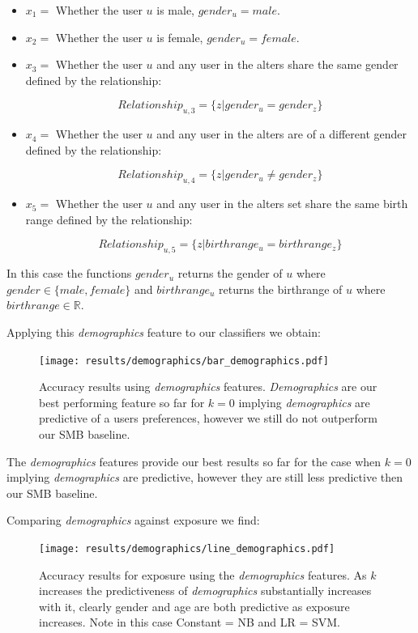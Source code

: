 \begin{itemize}
\item $x_1 = $ Whether the user $u$ is male, $gender_u = male$.
\item $x_2 = $ Whether the user $u$ is female, $gender_u = female$.
\item $x_3 = $ Whether the user $u$ and any user in the alters share the same gender defined by the relationship:

\[ Relationship_{u,3} = \{z | gender_u = gender_z\} \]

\item $x_4 = $ Whether the user $u$ and any user in the alters are of a different gender defined by the relationship:

\[ Relationship_{u,4} = \{z | gender_u \neq gender_z\} \]

\item $x_5 = $ Whether the user $u$ and any user in the alters set share the same birth range defined by the relationship:

\[ Relationship_{u,5} = \{z | birthrange_u = birthrange_z\} \]

\end{itemize}

In this case the functions $gender_{u}$ returns the gender of $u$ where $gender \in \{male, female\}$ and $birthrange_u$ returns 
the birthrange of $u$ where $birthrange \in \mathbb{R}$.

Applying this \emph{demographics} feature to our classifiers we obtain:

\begin{figure}[h]
	\begin{center}
		\texttt{[image: results/demographics/bar\_demographics.pdf]}
		\caption{Accuracy results using \emph{demographics} features. \emph{Demographics} are our best performing feature so far for $k=0$ implying \emph{demographics} are predictive of a users preferences, 
				 however we still do not outperform our SMB baseline.}
	\end{center}
\end{figure}

The \emph{demographics} features provide our best results so far for the case when $k=0$ implying \emph{demographics} are predictive, however they are still less predictive then 
our SMB baseline.

\clearpage
	
Comparing \emph{demographics} against exposure we find:
	
\begin{figure}[h]
	\begin{center}
		\texttt{[image: results/demographics/line\_demographics.pdf]}
		\caption{Accuracy results for exposure using the \emph{demographics} features. As $k$ increases the predictiveness of \emph{demographics} substantially 
				 increases with it, clearly gender and age are both predictive as exposure increases. Note in this case Constant = NB and LR = SVM.}
	\end{center}
\end{figure}

